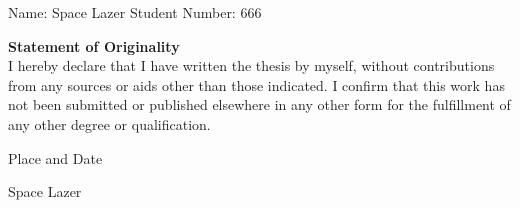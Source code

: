 \clearpage
\onecolumn
\thispagestyle{empty}
\begin{LARGE}
\noindent Name: Space Lazer \hfill Student Number: 666 \vspace{2cm}

\noindent\textbf{Statement of Originality}\\
\noindent\large{I hereby declare that I have written the thesis by myself, without contributions from any sources or aids other than those indicated. I confirm that this work has not been submitted or published elsewhere in any other form for the fulfillment of any other degree or qualification.}\vspace{2cm}

\noindent\begin{minipage}[t]{0.45\textwidth}
\dotfill

\begin{center}
    Place and Date
\end{center}
\end{minipage}
\hfill
\begin{minipage}[t]{0.45\textwidth}
\dotfill

\begin{center}
    Space Lazer
\end{center}
\end{minipage}


\end{LARGE}

\clearpage
